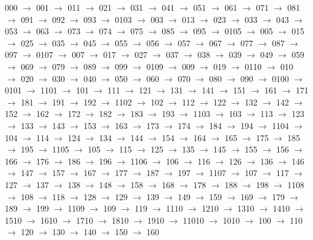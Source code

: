 000 $\rightarrow$ 001 $\rightarrow$ 011 $\rightarrow$ 021 $\rightarrow$ 031 $\rightarrow$ 041 $\rightarrow$ 051 $\rightarrow$ 061 $\rightarrow$ 071 $\rightarrow$ 081 $\rightarrow$ 091 $\rightarrow$ 092 $\rightarrow$ 093 $\rightarrow$ 0103 $\rightarrow$ 003 $\rightarrow$ 013 $\rightarrow$ 023 $\rightarrow$ 033 $\rightarrow$ 043 $\rightarrow$ 053 $\rightarrow$ 063 $\rightarrow$ 073 $\rightarrow$ 074 $\rightarrow$ 075 $\rightarrow$ 085 $\rightarrow$ 095 $\rightarrow$ 0105 $\rightarrow$ 005 $\rightarrow$ 015 $\rightarrow$ 025 $\rightarrow$ 035 $\rightarrow$ 045 $\rightarrow$ 055 $\rightarrow$ 056 $\rightarrow$ 057 $\rightarrow$ 067 $\rightarrow$ 077 $\rightarrow$ 087 $\rightarrow$ 097 $\rightarrow$ 0107 $\rightarrow$ 007 $\rightarrow$ 017 $\rightarrow$ 027 $\rightarrow$ 037 $\rightarrow$ 038 $\rightarrow$ 039 $\rightarrow$ 049 $\rightarrow$ 059 $\rightarrow$ 069 $\rightarrow$ 079 $\rightarrow$ 089 $\rightarrow$ 099 $\rightarrow$ 0109 $\rightarrow$ 009 $\rightarrow$ 019 $\rightarrow$ 0110 $\rightarrow$ 010 $\rightarrow$ 020 $\rightarrow$ 030 $\rightarrow$ 040 $\rightarrow$ 050 $\rightarrow$ 060 $\rightarrow$ 070 $\rightarrow$ 080 $\rightarrow$ 090 $\rightarrow$ 0100 $\rightarrow$ 0101 $\rightarrow$ 1101 $\rightarrow$ 101 $\rightarrow$ 111 $\rightarrow$ 121 $\rightarrow$ 131 $\rightarrow$ 141 $\rightarrow$ 151 $\rightarrow$ 161 $\rightarrow$ 171 $\rightarrow$ 181 $\rightarrow$ 191 $\rightarrow$ 192 $\rightarrow$ 1102 $\rightarrow$ 102 $\rightarrow$ 112 $\rightarrow$ 122 $\rightarrow$ 132 $\rightarrow$ 142 $\rightarrow$ 152 $\rightarrow$ 162 $\rightarrow$ 172 $\rightarrow$ 182 $\rightarrow$ 183 $\rightarrow$ 193 $\rightarrow$ 1103 $\rightarrow$ 103 $\rightarrow$ 113 $\rightarrow$ 123 $\rightarrow$ 133 $\rightarrow$ 143 $\rightarrow$ 153 $\rightarrow$ 163 $\rightarrow$ 173 $\rightarrow$ 174 $\rightarrow$ 184 $\rightarrow$ 194 $\rightarrow$ 1104 $\rightarrow$ 104 $\rightarrow$ 114 $\rightarrow$ 124 $\rightarrow$ 134 $\rightarrow$ 144 $\rightarrow$ 154 $\rightarrow$ 164 $\rightarrow$ 165 $\rightarrow$ 175 $\rightarrow$ 185 $\rightarrow$ 195 $\rightarrow$ 1105 $\rightarrow$ 105 $\rightarrow$ 115 $\rightarrow$ 125 $\rightarrow$ 135 $\rightarrow$ 145 $\rightarrow$ 155 $\rightarrow$ 156 $\rightarrow$ 166 $\rightarrow$ 176 $\rightarrow$ 186 $\rightarrow$ 196 $\rightarrow$ 1106 $\rightarrow$ 106 $\rightarrow$ 116 $\rightarrow$ 126 $\rightarrow$ 136 $\rightarrow$ 146 $\rightarrow$ 147 $\rightarrow$ 157 $\rightarrow$ 167 $\rightarrow$ 177 $\rightarrow$ 187 $\rightarrow$ 197 $\rightarrow$ 1107 $\rightarrow$ 107 $\rightarrow$ 117 $\rightarrow$ 127 $\rightarrow$ 137 $\rightarrow$ 138 $\rightarrow$ 148 $\rightarrow$ 158 $\rightarrow$ 168 $\rightarrow$ 178 $\rightarrow$ 188 $\rightarrow$ 198 $\rightarrow$ 1108 $\rightarrow$ 108 $\rightarrow$ 118 $\rightarrow$ 128 $\rightarrow$ 129 $\rightarrow$ 139 $\rightarrow$ 149 $\rightarrow$ 159 $\rightarrow$ 169 $\rightarrow$ 179 $\rightarrow$ 189 $\rightarrow$ 199 $\rightarrow$ 1109 $\rightarrow$ 109 $\rightarrow$ 119 $\rightarrow$ 1110 $\rightarrow$ 1210 $\rightarrow$ 1310 $\rightarrow$ 1410 $\rightarrow$ 1510 $\rightarrow$ 1610 $\rightarrow$ 1710 $\rightarrow$ 1810 $\rightarrow$ 1910 $\rightarrow$ 11010 $\rightarrow$ 1010 $\rightarrow$ 100 $\rightarrow$ 110 $\rightarrow$ 120 $\rightarrow$ 130 $\rightarrow$ 140 $\rightarrow$ 150 $\rightarrow$ 160 